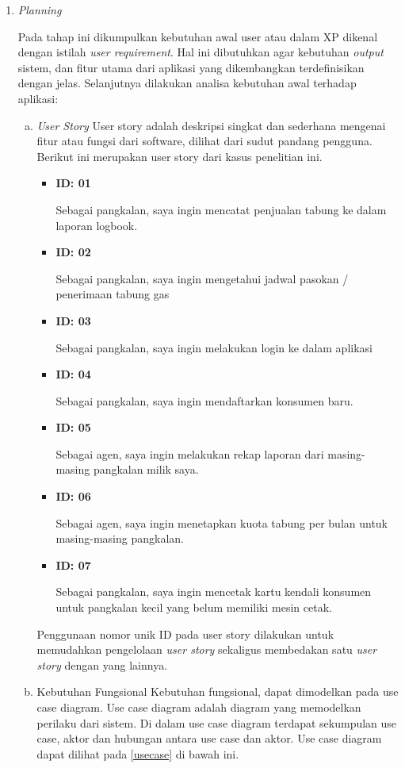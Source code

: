 \begin{enumerate}[1.]
	\item \emph {Planning}
	
	Pada tahap ini dikumpulkan kebutuhan awal user atau dalam XP dikenal dengan istilah \emph {user requirement}. Hal ini dibutuhkan agar kebutuhan \emph {output} sistem, dan fitur utama dari aplikasi yang dikembangkan terdefinisikan dengan jelas. Selanjutnya dilakukan analisa kebutuhan awal terhadap aplikasi:
	
	\begin{enumerate}[a.]
		\item \textit{User Story}
		User story adalah deskripsi singkat dan sederhana mengenai fitur atau fungsi dari software, dilihat dari sudut pandang pengguna. Berikut ini merupakan user story dari kasus penelitian ini.
		\begin{itemize}
			\item \textbf{ID: 01}
			\par Sebagai pangkalan, saya ingin mencatat penjualan tabung ke dalam laporan logbook.
			\item \textbf{ID: 02}
			\par Sebagai pangkalan, saya ingin mengetahui jadwal pasokan / penerimaan tabung gas
			\item \textbf{ID: 03}
			\par Sebagai pangkalan, saya ingin melakukan login ke dalam aplikasi
			\item \textbf{ID: 04}
			\par Sebagai pangkalan, saya ingin mendaftarkan konsumen baru.
			\item \textbf{ID: 05}
			\par Sebagai agen, saya ingin melakukan rekap laporan dari masing-masing pangkalan milik saya.
			\item \textbf{ID: 06}
			\par Sebagai agen, saya ingin menetapkan kuota tabung per bulan untuk masing-masing pangkalan.
			\item \textbf{ID: 07}
			\par Sebagai pangkalan, saya ingin mencetak kartu kendali konsumen untuk pangkalan kecil yang belum memiliki mesin cetak.
		\end{itemize}
		Penggunaan nomor unik ID pada user story dilakukan untuk memudahkan pengelolaan \textit{user story} sekaligus membedakan satu \textit{user story} dengan yang lainnya.
		
		\item Kebutuhan Fungsional
		\newline Kebutuhan fungsional, dapat dimodelkan pada use case diagram. Use case diagram adalah diagram yang memodelkan perilaku dari sistem. Di dalam use case diagram terdapat sekumpulan use case, aktor dan hubungan antara use case dan aktor. Use case diagram dapat dilihat pada \ref{usecase} di bawah ini.
		

\end{enumerate}
\end{enumerate}
